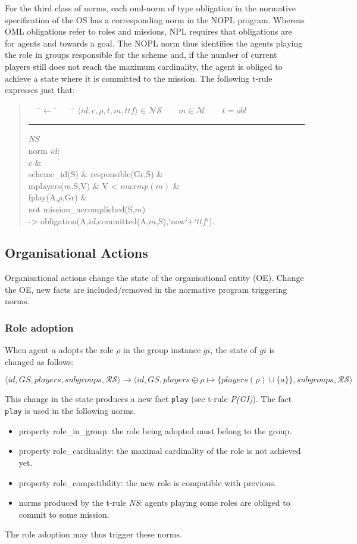 \documentclass{article}
\newcommand{\set}[1]{\mathcal{#1}}
\newcommand{\andalso}{\quad\quad}
\newcommand{\code}[1]{\texttt{#1}}
\newenvironment{rwrule}[2]
{\begin{quote}\ttfamily\begin{tabbing}~~~\=$\leftarrow$ \= ~~~ \= \kill
     \ensuremath{#2}\\
     \rule[2pt]{6.5cm}{.3pt} \hfill \rwlabel{#1}\\}
{\end{tabbing}\end{quote}}
\newcommand{\rwlabel}[1]{{\scshape\itshape\textrm{#1}}}
\theoremstyle{definition} \newtheorem{definition}{Definition}
\begin{document}
For the third class of norms, each oml-norm of type obligation in the
normative specification of the OS has a corresponding norm in the NOPL
program.
%
Whereas OML obligations refer to roles and missions, NPL requires that
obligations are for agents and towards a goal. The NOPL norm thus
identifies the agents playing the role in groups responsible for the
scheme and, if the number of current players still does not reach the
maximum cardinality, the agent is obliged to achieve a state where it
is committed to the mission.
%
The following t-rule expresses just that:

\begin{rwrule}{NS}
{\langle id, c, \rho, t, m, ttf \rangle \in \mathcal{NS} \andalso m \in \set{M} \andalso t = obl}
norm $id$: \\
\>\>          $c$ \& \\
\>\>          scheme\_id(S) \& responsible(Gr,S) \&\\
\>\>          mplayers($m$,S,V) \& V < $maxmp(m)$ \&\\
\>\>          fplay(A,$\rho$,Gr) \& \\
\>\>          not mission\_accomplished(S,$m$) \\
-> \> obligation(A,$id$,committed(A,$m$,S),`now`+`$ttf$`).
\end{rwrule}


\subsection{Organisational Actions}

Organisational actions change the state of the organisational entity
(OE). Change the OE, new facts are included/removed in the normative
program triggering norms.


\subsubsection{Role adoption}

When agent $a$ adopts the role $\rho$ in the group instance $gi$, the
state of $gi$ is changed as follows:

\[
\langle id, GS, players, subgroups, \set{RS} \rangle  \longrightarrow
\langle id, GS, players \oplus \rho \mapsto \{ players(\rho) \cup \{a\} \}, subgroups, \set{RS} \rangle
\]

This change in the state produces a new fact \code{play} (see t-rule
\rwlabel{P(GI)}). The fact \code{play} is used in the following norms.
\begin{itemize}
\item property role\_in\_group: the role being adopted must belong to
  the group.
\item property role\_cardinality: the maximal cardinality of the role
  is not achieved yet.
\item property role\_compatibility: the new role is compatible with previous.
\item norms produced by the t-rule \rwlabel{NS}: agents playing some
  roles are obliged to commit to some mission.
\end{itemize}
The role adoption may thus trigger these norms.
\end{document}
